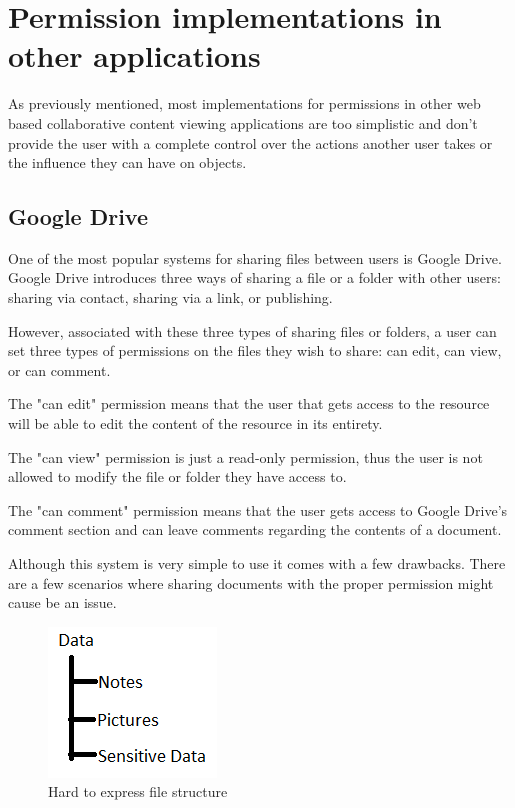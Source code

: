 \chapter{Permission implementations in other applications}
As previously mentioned, most implementations for permissions in other web based collaborative content viewing applications are too simplistic and don't provide the user with a complete control over the actions another user takes or the influence they can have on objects. 

\section{Google Drive}
One of the most popular systems for sharing files between users is Google Drive.
Google Drive introduces three ways of sharing a file or a folder with other users:
sharing via contact, sharing via a link, or publishing.

However, associated with these three types of sharing files or folders, a user can set three types of permissions on the files they wish to share: can edit, can view, or can comment. \cite{googleDrivePermission:1}

The "can edit" permission means that the user that gets access to the resource will be able to edit the content of the resource in its entirety.

The "can view" permission is just a read-only permission, thus the user is not allowed to modify the file or folder they have access to.

The "can comment" permission means that the user gets access to Google Drive's comment section and can leave comments regarding the contents of a document.

Although this system is very simple to use it comes with a few drawbacks. There are a few scenarios where sharing documents with the proper permission might cause be an issue. 

\begin{figure}[htbp]
	\centering
		\includegraphics[scale=0.85]{./figures/chapter2/google_drive_file_structure.png}
	\caption{Hard to express file structure}
	\label{FigDriveBadScenario}
\end{figure}

